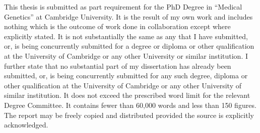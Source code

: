 
\begin{declaration}

This thesis is submitted as part requirement for the PhD Degree in ``Medical Genetics'' at Cambridge University.
It is the result of my own work and includes nothing which is the outcome of work done in collaboration except where explicitly stated.
It is not substantially the same as any that I have submitted, or, is being concurrently submitted for a degree or diploma or other qualification at the University of Cambridge or any other University or similar institution.
I further state that no substantial part of my dissertation has already been submitted, or, is being concurrently submitted for any such degree, diploma or other qualification at the University of Cambridge or any other University of similar institution.
It does not exceed the prescribed word limit for the relevant Degree Committee.
It contains fewer than 60,000 words and less than 150 figures.
The report may be freely copied and distributed provided the source is explicitly acknowledged.

\end{declaration}

